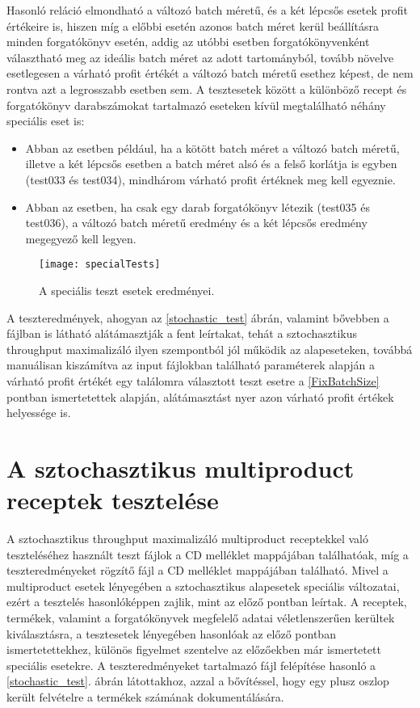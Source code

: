 Hasonló reláció elmondható a változó batch méretű, és a két lépcsős esetek profit értékeire is, hiszen míg a előbbi esetén azonos batch méret kerül beállításra minden forgatókönyv esetén, addig az utóbbi esetben forgatókönyvenként választható meg az ideális batch méret az adott tartományból, tovább növelve esetlegesen a várható profit értékét a változó batch méretű esethez képest, de nem rontva azt a legrosszabb esetben sem.
A tesztesetek között a különböző recept és forgatókönyv darabszámokat tartalmazó eseteken kívül megtalálható néhány speciális eset is:
\begin{itemize}
\item Abban az esetben például, ha a kötött batch méret a változó batch méretű, illetve a két lépcsős esetben a batch méret alsó és a felső korlátja is egyben (test033 és test034), mindhárom várható profit értéknek meg kell egyeznie.
\item Abban az esetben, ha csak egy darab forgatókönyv létezik (test035 és test036), a változó batch méretű eredmény és a két lépcsős eredmény megegyező kell legyen.
\end{itemize}
\begin{figure}[H]
\begin{center}
\texttt{[image: specialTests]}
\caption{A speciális teszt esetek eredményei.}
\label{special_tests}
\end{center}
\end{figure} 
A teszteredmények, ahogyan az \ref{stochastic_test} ábrán, valamint bővebben a  fájlban is látható alátámasztják a fent leírtakat, tehát a sztochasztikus throughput maximalizáló ilyen szempontból jól működik az alapeseteken, továbbá manuálisan kiszámítva az input fájlokban található paraméterek alapján a várható profit értékét egy találomra választott teszt esetre a \ref{FixBatchSize} pontban ismertetettek alapján, alátámasztást nyer azon várható profit értékek helyessége is.
\pagebreak
\section{A sztochasztikus multiproduct receptek tesztelése}
A sztochasztikus throughput maximalizáló multiproduct receptekkel való teszteléséhez használt teszt fájlok a CD melléklet   mappájában találhatóak, míg a teszteredményeket rögzítő  fájl a CD melléklet  mappájában található.
Mivel a multiproduct esetek lényegében a sztochasztikus alapesetek speciális változatai, ezért a tesztelés hasonlóképpen zajlik, mint az előző pontban leírtak.
A receptek, termékek, valamint a forgatókönyvek megfelelő adatai véletlenszerűen kerültek kiválasztásra, a tesztesetek lényegében hasonlóak az előző pontban ismertetettekhez, különös figyelmet szentelve az előzőekben már ismertetett speciális esetekre.
A teszteredményeket tartalmazó  fájl felépítése hasonló a \ref{stochastic_test}. ábrán látottakhoz, azzal a bővítéssel, hogy egy plusz oszlop került felvételre a termékek számának dokumentálására.
